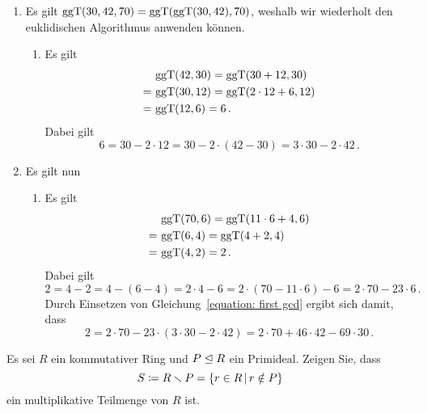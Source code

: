 \documentclass[a4paper, 10pt]{scrartcl}
\begin{document}
\begin{solution}
\begin{enumerate}
    \item
      Es gilt $\operatorname{ggT}(30,42,70) = \operatorname{ggT}(\operatorname{ggT}(30, 42), 70)$, weshalb wir wiederholt den euklidischen Algorithmus anwenden können.
      \begin{enumerate}
        \item
          Es gilt
          \begin{align*}
             &\,  \operatorname{ggT}(42, 30)
            =     \operatorname{ggT}(30 + 12, 30)
          \\
            =&\,  \operatorname{ggT}(30, 12)
            =     \operatorname{ggT}(2 \cdot 12 + 6, 12)
          \\
            =&\,  \operatorname{ggT}(12,6)
            =     6 \,.
          \end{align*}
          Dabei gilt
          \begin{equation}
            \label{equation: first gcd}
              6
            = 30 - 2 \cdot 12
            = 30 - 2 \cdot (42 - 30)
            = 3 \cdot 30 - 2 \cdot 42 \,.
          \end{equation}
      \end{enumerate}
    \item
      Es gilt nun
      \begin{enumerate}
        \item
          Es gilt
          \begin{align*}
             &\,  \operatorname{ggT}(70, 6)
            =     \operatorname{ggT}(11 \cdot 6 + 4, 6)
          \\
            =&\,  \operatorname{ggT}(6, 4)
            =     \operatorname{ggT}(4 + 2, 4)
          \\
            =&\,  \operatorname{ggT}(4, 2)
            =     2 \,.
          \end{align*}
          Dabei gilt
          \[
              2
            = 4 - 2
            = 4 - (6 - 4)
            = 2 \cdot 4 - 6
            = 2 \cdot (70 - 11 \cdot 6) - 6
            = 2 \cdot 70 -  23 \cdot 6 \,.
          \]
          Durch Einsetzen von Gleichung~\eqref{equation: first gcd} ergibt sich damit, dass
          \[
              2
            = 2 \cdot 70 - 23 \cdot (3 \cdot 30 - 2 \cdot 42)
            = 2 \cdot 70 + 46 \cdot 42 - 69 \cdot 30 \,.
          \]

      \end{enumerate}
  \end{enumerate}
\end{solution}

\begin{question}
  Es sei $R$ ein kommutativer Ring und $P \mathrel{\trianglelefteq} R$ ein Primideal.
  Zeigen Sie, dass
  \[
              S
    \defined  R \smallsetminus P
    =         \{ r \in R \suchthat r \notin P \}
  \]
  ein multiplikative Teilmenge von $R$ ist.
\end{question}
\end{document}
